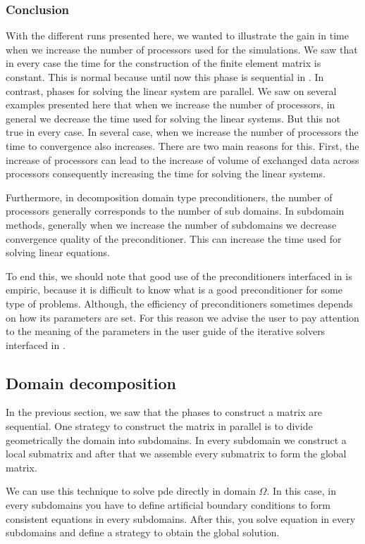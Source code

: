 \documentclass[a4paper,twoside,12pt]{book}
\begin{document}
\subsubsection{Conclusion}
With the different runs presented here, we wanted to illustrate the gain in time
when we increase the number of processors used for the simulations. We saw that in
every case the time for the construction of the finite element matrix is constant. This is normal
because until now this phase is sequential in \freefempp. In contrast, phases
for solving the linear system are parallel. We saw on several examples
presented here that when we increase the number of processors, in general we
decrease the time used for solving the linear systems. But this not true in every
case. In several case, when we increase the number of processors the time to
convergence also increases. There are two main reasons for this.
First, the increase of processors can lead to the increase of volume of exchanged
data across processors consequently  increasing the time for solving the linear
systems.

Furthermore, in  decomposition domain type preconditioners, the number of processors
generally corresponds to the number of sub domains. In subdomain methods,
generally when we increase the number of subdomains we decrease convergence
quality of the preconditioner. This can increase the time used for
solving linear equations.

To end this, we should note that good use of the preconditioners interfaced in
\freefempp is empiric, because it is difficult to know what is a good
preconditioner for some type of problems. Although, the efficiency of
preconditioners sometimes depends on how its parameters are set. For
this reason we advise the user to pay attention to  the meaning of the parameters in the
user guide of the iterative solvers interfaced in \freefempp.


\subsection{Domain decomposition}
In the previous section, we saw that the phases to construct a matrix are
sequential. One strategy to construct the matrix in parallel is to divide
geometrically the domain into subdomains. In every subdomain we construct a local
submatrix and after that we assemble every submatrix to form the global matrix.

We can use this technique to solve pde directly in domain $\Omega$. In this case,
in every subdomains you have to define artificial boundary conditions to form
consistent equations in every subdomains. After this, you solve equation in
every subdomains and define a strategy to obtain the global solution.
\end{document}

